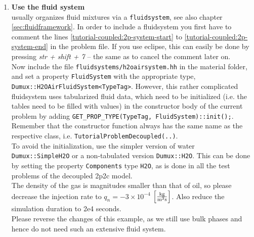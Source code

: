 \begin{enumerate}
\item \textbf{Use the \Dumux fluid system}\label{dec-ex1-fluidsystem} \\
\Dumux usually organizes fluid mixtures via a \texttt{fluidsystem}, see also chapter \ref{sec:fluidframework}. In order to include a fluidsystem you first have to comment the lines \ref{tutorial-coupled:2p-system-start} to \ref{tutorial-coupled:2p-system-end} in the problem file. If you use eclipse, this can easily be done by pressing \textit{str + shift + 7} -- the same as to cancel the comment later on.\\
Now include the file \texttt{fluidsystems/h2oairsystem.hh} in the material folder, and set a property \texttt{FluidSystem} with the appropriate type, \texttt{Dumux::H2OAirFluidSystem<TypeTag>}. However, this rather complicated fluidsystem uses tabularized fluid data, which need to be initialized (i.e. the tables need to be filled with values) in the constructor body of the current problem by adding \texttt{GET\_PROP\_TYPE(TypeTag, FluidSystem)::init();}. Remember that the constructor function always has the same name as the respective class, i.e. \texttt{TutorialProblemDecoupled(..)}.\\
To avoid the initialization, use the simpler version of water \texttt{Dumux::SimpleH2O} or a non-tabulated version \texttt{Dumux::H2O}. This can be done by setting the property \texttt{Components} type \texttt{H2O},
as is done in all the test problems of the decoupled 2p2c model.\\
The density of the gas is magnitudes smaller than that of oil, so please decrease the injection rate to $q_n = -3 \times 10^{-4}$ $\left[\frac{\textnormal{kg}}{\textnormal{m}^2 \textnormal{s}}\right]$. Also reduce the simulation duration to 2e4 seconds.\\
Please reverse the changes of this example, as we still use bulk phases and hence do not need such an extensive fluid system.
 

\end{enumerate}
